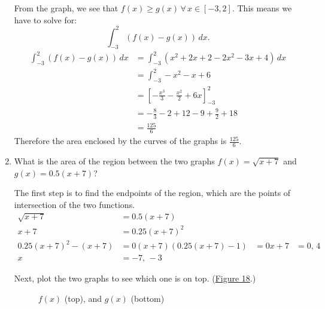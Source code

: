 \documentclass[12pt]{article}
\begin{document}
\begin{enumerate}
	      From the graph, we see that $f(x) \ge g(x) \, \forall \, x \in [-3, 2]$. This means we have to solve for:
	      \[ \int_{-3}^2 \left( f(x) - g(x) \right) \, dx. \]
	      \begin{align*}
		      \int_{-3}^2 \left( f(x) - g(x) \right) \, dx & = \int_{-3}^2 \left( x^2 + 2x + 2 - 2x^2 - 3x + 4 \right) \, dx \\[6pt]
		      & = \int_{-3}^2 -x^2 - x + 6                                      \\[6pt]
		      & = \left[ -\frac{x^3}{3} -\frac{x^2}{2} + 6x \right]_{-3}^2      \\[6pt]
		      & = -\frac{8}{3} - 2 + 12 - 9 +\frac{9}{2} + 18                   \\[6pt]
		      & = \frac{125}{6}
	      \end{align*}
	      Therefore the area enclosed by the curves of the graphs is $\frac{125}{6}$.
	      \smallskip

	\item What is the area of the region between the two graphs $f(x) = \sqrt{x+7}$ and $g(x) = 0.5(x+7)$?

	      The first step is to find the endpoints of the region, which are the points of intersection of the two functions.
	      \begin{align*}
		      \sqrt{x+7}                         & = 0.5(x+7)    \\
		      x+7                                & = 0.25(x+7)^2 \\
		      0.25(x+7)^2 - (x+7)                & = 0
		      (x+7) \left( 0.25(x+7) - 1 \right) & = 0
		      x+7                                & = 0, \, 4     \\
		      x                                  & = -7, \, -3
	      \end{align*}

	      Next, plot the two graphs to see which one is on top. (\hyperref[fig:abcx2]{Figure 18}.)

	      \begin{figure}[H]
		      \begin{center}
			      \caption{$f(x)$ (top), and $g(x)$ (bottom)}
			      \label{fig:abcx2}
		      \end{center}
	      \end{figure}


\end{enumerate}
\end{document}
